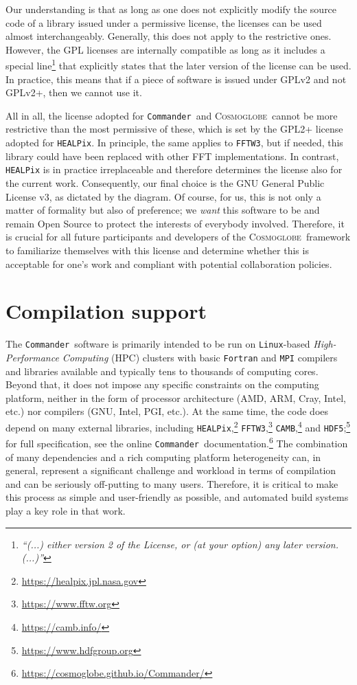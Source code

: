 \documentclass[twocolumn]{aa}
\def\commander{\texttt{Commander}}
\newcommand{\cosmoglobe}{\textsc{Cosmoglobe}}
\begin{document}
Our understanding is that as long as one does not explicitly modify the source code of a library issued under a permissive license, the licenses can be used almost interchangeably. Generally, this does not apply to the restrictive ones. However, the GPL licenses are internally compatible as long as it includes a special line\footnote{ \textit{``(...) either version 2 of the License, or (at your option) any later version. (...)''}}  that explicitly states that the later version of the license can be used. In practice, this means that if a piece of software is issued under GPLv2 and not GPLv2+, then we cannot use it.  

All in all, the license adopted for \commander\ and \cosmoglobe\ cannot be more restrictive than the most permissive of these, which is set by the GPL2+ license adopted for \texttt{HEALPix}. In principle, the same applies to \texttt{FFTW3}, but if needed, this library could have been replaced with other FFT implementations. In contrast, \texttt{HEALPix} is in practice irreplaceable and therefore determines the license also for the current work. Consequently, our final choice is the GNU General Public License v3, as dictated by the diagram. Of course, for us, this is not only a matter of formality but also of preference; we \emph{want} this software to be and remain Open Source to protect the interests of everybody involved. Therefore, it is crucial for all future participants and developers of the \cosmoglobe\ framework to familiarize themselves with this license and determine whether this is acceptable for one's work and compliant with potential collaboration policies.

\section{Compilation support}
\label{sec:compilation_support}

The \commander\ software is primarily intended to be run on \texttt{Linux}-based \textit{High-Performance Computing} (HPC) clusters with basic \texttt{Fortran} and \texttt{MPI} compilers and libraries available and typically tens to thousands of computing cores. Beyond that, it does not impose any specific constraints on the computing platform, neither in the form of processor architecture (AMD, ARM, Cray, Intel, etc.)  nor compilers (GNU, Intel, PGI, etc.). At the same time, the code does depend on many external libraries, including \texttt{HEALPix},\footnote{\url{https://healpix.jpl.nasa.gov}} \texttt{FFTW3},\footnote{\url{https://www.fftw.org}} \texttt{CAMB},\footnote{\url{https://camb.info/}} and \texttt{HDF5};\footnote{\url{https://www.hdfgroup.org}} for full
specification, see the online \commander\ documentation.\footnote{\url{https://cosmoglobe.github.io/Commander/}} The combination of many dependencies and a rich computing platform heterogeneity can, in general, represent a significant challenge and workload in terms of compilation and can be seriously off-putting to many users. Therefore, it is critical to make this process as simple and user-friendly as possible, and automated build systems play a key role in that work.
\end{document}
